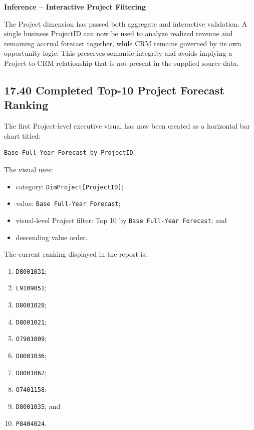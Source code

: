 \documentclass[11pt,a4paper]{article}
\begin{document}
\begin{inferencebox}

\textbf{Inference -- Interactive Project Filtering}

The Project dimension has passed both aggregate and interactive validation. A
single business ProjectID can now be used to analyze realized revenue and
remaining accrual forecast together, while CRM remains governed by its own
opportunity logic. This preserves semantic integrity and avoids implying a
Project-to-CRM relationship that is not present in the supplied source data.

\end{inferencebox}

\subsection{17.40 Completed Top-10 Project Forecast Ranking}

The first Project-level executive visual has now been created as a horizontal
bar chart titled:

\begin{lstlisting}[style=powerquery]
Base Full-Year Forecast by ProjectID
\end{lstlisting}

The visual uses:

\begin{itemize}[leftmargin=7mm,itemsep=2pt]
    \item category: \texttt{DimProject[ProjectID]};
    \item value: \texttt{Base Full-Year Forecast};
    \item visual-level Project filter: Top 10 by
    \texttt{Base Full-Year Forecast}; and
    \item descending value order.
\end{itemize}

The current ranking displayed in the report is:

\begin{enumerate}[leftmargin=9mm,itemsep=2pt]
    \item \texttt{D8001031};
    \item \texttt{L9109051};
    \item \texttt{D8001028};
    \item \texttt{D8001021};
    \item \texttt{O7901009};
    \item \texttt{D8001036};
    \item \texttt{D8001062};
    \item \texttt{O7401158};
    \item \texttt{D8001035}; and
    \item \texttt{P8404024}.
\end{enumerate}
\end{document}
